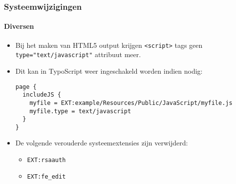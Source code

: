 \begin{frame}[fragile]
	\frametitle{Systeemwijzigingen}
	\framesubtitle{Diversen}

	\lstset{basicstyle=\tiny\ttfamily}

	\begin{itemize}

		\item Bij het maken van HTML5 output krijgen \texttt{<script>} tags geen
			\texttt{type="text/javascript"} attribuut meer.

		\item Dit kan in TypoScript weer ingeschakeld worden indien nodig:
\begin{lstlisting}
page {
  includeJS {
    myfile = EXT:example/Resources/Public/JavaScript/myfile.js
    myfile.type = text/javascript
  }
}
\end{lstlisting}

		\item De volgende verouderde systeemextensies zijn verwijderd:

			\begin{itemize}
				\item \texttt{EXT:rsaauth}
				\item \texttt{EXT:fe\_edit}
			\end{itemize}

	\end{itemize}

\end{frame}


